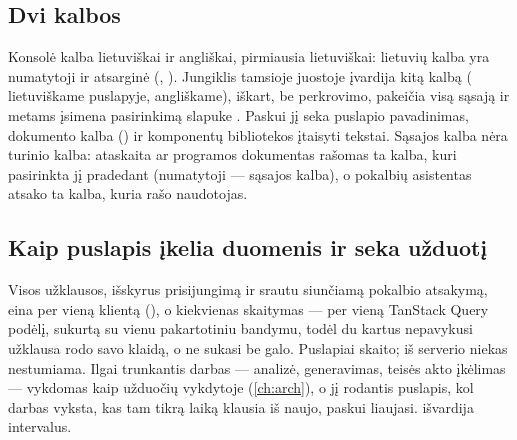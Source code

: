 \subsection{Dvi kalbos}\label{sec:console:lang}

Konsolė kalba lietuviškai ir angliškai, pirmiausia lietuviškai: lietuvių kalba yra numatytoji ir
atsarginė (, ). Jungiklis tamsioje juostoje įvardija
kitą kalbą ( lietuviškame puslapyje,  angliškame), iškart, be perkrovimo,
pakeičia visą sąsają ir metams įsimena pasirinkimą slapuke . Paskui jį seka puslapio
pavadinimas, dokumento kalba () ir komponentų bibliotekos įtaisyti tekstai.
Sąsajos kalba nėra turinio kalba: ataskaita ar programos dokumentas rašomas ta kalba, kuri
pasirinkta jį pradedant (numatytoji --- sąsajos kalba), o pokalbių asistentas atsako ta kalba,
kuria rašo naudotojas.

\subsection{Kaip puslapis įkelia duomenis ir seka užduotį}\label{sec:console:data}

Visos užklausos, išskyrus prisijungimą ir srautu siunčiamą pokalbio atsakymą, eina per vieną
klientą (), o kiekvienas skaitymas --- per vieną TanStack Query podėlį,
sukurtą  su vienu pakartotiniu bandymu, todėl du kartus nepavykusi užklausa rodo
savo klaidą, o ne sukasi be galo. Puslapiai skaito; iš serverio niekas nestumiama. Ilgai
trunkantis darbas --- analizė, generavimas, teisės akto įkėlimas --- vykdomas kaip
 užduočių vykdytoje (\cref{ch:arch}), o jį rodantis puslapis, kol darbas vyksta,
kas tam tikrą laiką klausia iš naujo, paskui liaujasi.  išvardija
intervalus.

